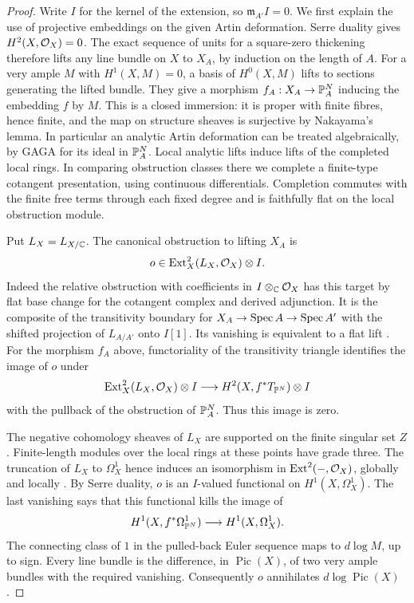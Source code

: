 \begin{proof}
Write $I$ for the kernel of the extension, so $\mathfrak m_{A'}I=0$.
We first explain the use of projective embeddings on the given Artin
deformation. Serre duality gives $H^2(X,\mathcal O_X)=0$. The exact sequence of
units for a square-zero thickening therefore lifts any line bundle on $X$
to $X_A$, by induction on the length of $A$. For a very ample $M$ with
$H^1(X,M)=0$, a basis of $H^0(X,M)$ lifts to sections generating
the lifted bundle. They give a morphism $f_A:X_A\to\mathbb P^N_A$ inducing
the embedding $f$ by $M$. This is a closed immersion: it is proper
with finite fibres, hence finite, and the map on structure sheaves is
surjective by Nakayama's lemma. In particular an analytic Artin
deformation can be treated algebraically, by GAGA for its ideal in
$\mathbb P^N_A$. Local analytic lifts induce lifts of the completed local
rings. In comparing obstruction classes there we complete a
finite-type cotangent presentation, using continuous differentials.
Completion commutes with the finite free terms through each fixed
degree and is faithfully flat on the local obstruction module.

Put $L_X=L_{X/\mathbb C}$. The canonical obstruction to lifting $X_A$ is
\[
 o\in\operatorname{Ext}^2_X(L_X,\mathcal O_X)\otimes I.
\]
Indeed the relative obstruction with coefficients in $I\otimes_\mathbb C\mathcal O_X$ has
this target by flat base change for the cotangent complex and derived
adjunction. It is the composite of the transitivity boundary for
$X_A\to\operatorname{Spec} A\to\operatorname{Spec} A'$ with the shifted projection of
$L_{A/A'}$ onto $I[1]$. Its vanishing is equivalent to a flat lift
\cite[Tags 08UZ and 063Y]{Stacks}.
For the morphism $f_A$ above, functoriality of the transitivity triangle
identifies the image of $o$ under
\[
 \operatorname{Ext}^2_X(L_X,\mathcal O_X)\otimes I
    \longrightarrow H^2(X,f^*T_{\mathbb P^N})\otimes I
\]
with the pullback of the obstruction of $\mathbb P^N_A$. Thus this image is
zero.

The negative cohomology sheaves of $L_X$ are supported on the finite
singular set $Z$. Finite-length modules over the local rings at these
points have grade three. The truncation of $L_X$ to $\Omega_X^1$ hence
induces an isomorphism in $\operatorname{Ext}^2(-,\mathcal O_X)$, globally and locally
\cite[Lemma~2.2]{W5}. By Serre duality, $o$ is an $I$-valued functional
on $H^1(X,\Omega_X^1)$. The last vanishing says that this functional
kills the image of
\[
 H^1(X,f^*\Omega^1_{\mathbb P^N})\longrightarrow H^1(X,\Omega_X^1).
\]
The connecting class of $1$ in the pulled-back Euler sequence maps to
$d\log M$, up to sign. Every line bundle is the difference, in
$\operatorname{Pic}(X)$, of two very ample bundles with the required
vanishing. Consequently $o$ annihilates $d\log\operatorname{Pic}(X)$.


\end{proof}
